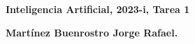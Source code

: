 \documentclass[12pt,twoside]{article}
\date{}
\begin{document}
    \centerline{\bf Inteligencia Artificial, 2023-i, Tarea 1}
    \centerline{}
    \centerline{\bf {Martínez Buenrostro Jorge Rafael.}}
    
    
    
\end{document}
